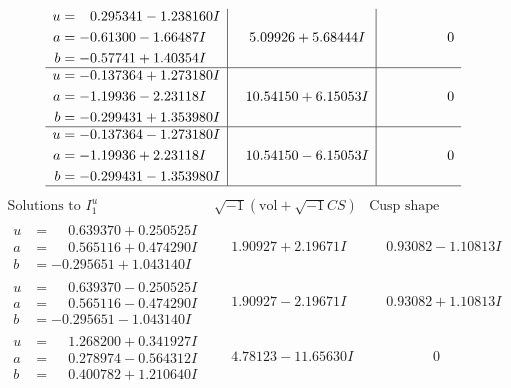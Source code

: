 \documentclass[1p]{elsarticle_modified}
\theoremstyle{definition}
\newcommand{\I}{\sqrt{-1}}
\begin{document}
$$\begin{array}{c|c|c}
\begin{aligned}
u &= \phantom{-}0.295341 - 1.238160 I \\
a &= -0.61300 - 1.66487 I \\
b &= -0.57741 + 1.40354 I\end{aligned}
 & \phantom{-}5.09926 + 5.68444 I & \phantom{-0.000000 } 0 \\ \hline\begin{aligned}
u &= -0.137364 + 1.273180 I \\
a &= -1.19936 - 2.23118 I \\
b &= -0.299431 + 1.353980 I\end{aligned}
 & \phantom{-}10.54150 + 6.15053 I & \phantom{-0.000000 } 0 \\ \hline\begin{aligned}
u &= -0.137364 - 1.273180 I \\
a &= -1.19936 + 2.23118 I \\
b &= -0.299431 - 1.353980 I\end{aligned}
 & \phantom{-}10.54150 - 6.15053 I & \phantom{-0.000000 } 0\\
 \hline 
 \end{array}$$\newpage$$\begin{array}{c|c|c}  
\text{Solutions to }I^u_{1}& \I (\text{vol} + \sqrt{-1}CS) & \text{Cusp shape}\\
 \hline 
\begin{aligned}
u &= \phantom{-}0.639370 + 0.250525 I \\
a &= \phantom{-}0.565116 + 0.474290 I \\
b &= -0.295651 + 1.043140 I\end{aligned}
 & \phantom{-}1.90927 + 2.19671 I & \phantom{-}0.93082 - 1.10813 I \\ \hline\begin{aligned}
u &= \phantom{-}0.639370 - 0.250525 I \\
a &= \phantom{-}0.565116 - 0.474290 I \\
b &= -0.295651 - 1.043140 I\end{aligned}
 & \phantom{-}1.90927 - 2.19671 I & \phantom{-}0.93082 + 1.10813 I \\ \hline\begin{aligned}
u &= \phantom{-}1.268200 + 0.341927 I \\
a &= \phantom{-}0.278974 - 0.564312 I \\
b &= \phantom{-}0.400782 + 1.210640 I\end{aligned}
 & \phantom{-}4.78123 - 11.65630 I & \phantom{-0.000000 } 0 \\ \hline\begin{aligned}

\end{aligned}
\end{array}$$
\end{document}
